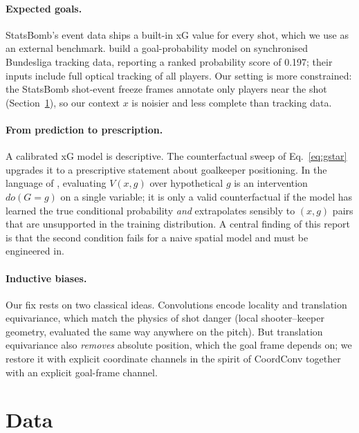 \documentclass[11pt,a4paper]{article}
\newcommand{\V}{V}
\begin{document}
\paragraph{Expected goals.}
StatsBomb's event data ships a built-in xG value for every shot, which we use as
an external benchmark. \citet{anzer2021goal} build a goal-probability model on
synchronised Bundesliga tracking data, reporting a ranked probability score of
\num{0.197}; their inputs include full optical tracking of all players. Our
setting is more constrained: the StatsBomb shot-event freeze frames annotate only
players near the shot (Section~\ref{sec:data}), so our context $x$ is
noisier and less complete than tracking data.

\paragraph{From prediction to prescription.}
A calibrated xG model is descriptive. The counterfactual sweep of
Eq.~\eqref{eq:gstar} upgrades it to a prescriptive statement about goalkeeper
positioning. In the language of \citet{pearl2009causality}, evaluating
$\V(x,g)$ over hypothetical $g$ is an intervention $do(G=g)$ on a single
variable; it is only a valid counterfactual if the model has learned the true
conditional probability \emph{and} extrapolates sensibly to $(x,g)$ pairs that
are unsupported in the training distribution. A central finding of this report
is that the second condition fails for a naive spatial model and must be
engineered in.

\paragraph{Inductive biases.}
Our fix rests on two classical ideas. Convolutions encode locality and
translation equivariance, which match the physics of shot danger (local
shooter--keeper geometry, evaluated the same way anywhere on the pitch). But
translation equivariance also \emph{removes} absolute position, which the goal
frame depends on; we restore it with explicit coordinate channels in the spirit
of CoordConv \citep{liu2018coordconv} together with an explicit goal-frame
channel.

\section{Data}
\label{sec:data}
\end{document}
